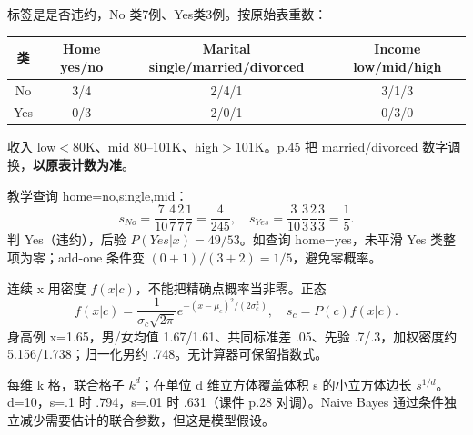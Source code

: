 标签是是否违约，No 类7例、Yes类3例。按原始表重数：
\begin{center}\small\begin{tabular}{c|c|c|c}\toprule
类&Home yes/no&Marital single/married/divorced&Income low/mid/high\\\midrule
No&3/4&2/4/1&3/1/3\\Yes&0/3&2/0/1&0/3/0\\\bottomrule\end{tabular}\end{center}
收入 low$<80$K、mid 80--101K、high$>101$K。p.45 把 married/divorced 数字调换，\textbf{以原表计数为准}。

教学查询 home=no,single,mid：
\[
s_{No}=\frac7{10}\frac47\frac27\frac17=\frac4{245},\quad
s_{Yes}=\frac3{10}\frac33\frac23\frac33=\frac15.
\]
判 Yes（违约），后验 $P(Yes|x)=49/53$。如查询 home=yes，未平滑 Yes 类整项为零；add-one 条件变 $(0+1)/(3+2)=1/5$，避免零概率。

连续 x 用密度 $f(x|c)$，不能把精确点概率当非零。正态
\[
f(x|c)=\frac1{\sigma_c\sqrt{2\pi}}e^{-(x-\mu_c)^2/(2\sigma_c^2)},\quad s_c=P(c)f(x|c).
\]
身高例 x=1.65，男/女均值 1.67/1.61、共同标准差 .05、先验 .7/.3，加权密度约 5.156/1.738；归一化男约 .748。无计算器可保留指数式。

每维 k 格，联合格子 $k^d$；在单位 d 维立方体覆盖体积 s 的小立方体边长 $s^{1/d}$。d=10，s=.1 时 .794，s=.01 时 .631（课件 p.28 对调）。Naive Bayes 通过条件独立减少需要估计的联合参数，但这是模型假设。
